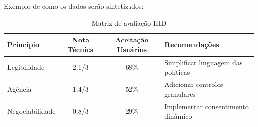 \documentclass[
	12pt,				%
	oneside,			%
	a4paper,			%
	english,			%
	brazil				%
	]{abntex2ppgsi}
\begin{document}
Exemplo de como os dados serão sintetizados:

\begin{table}[h]
    \centering
    \caption{Matriz de avaliação IHD}
    \label{tab:matriz-hdi}
    \begin{tabular}{lccp{4cm}}
        \hline
        \textbf{Princípio} & \textbf{Nota Técnica} & \textbf{Aceitação Usuários} & \textbf{Recomendações} \\ \hline
        Legibilidade & 2.1/3 & 68\% & Simplificar linguagem das políticas \\ \hline
        Agência & 1.4/3 & 52\% & Adicionar controles granulares \\ \hline
        Negociabilidade & 0.8/3 & 29\% & Implementar consentimento dinâmico \\ \hline
    \end{tabular}
\end{table}



    
\end{document}
